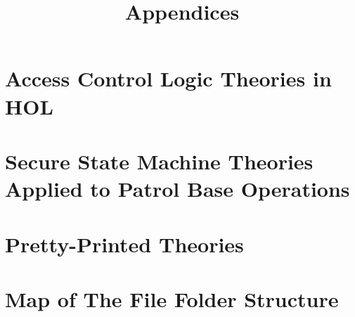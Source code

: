 \documentclass[../main/main.tex]{subfiles}
\begin{document}
\title{Appendices}

\begin{appendices}
\chapter{Access Control Logic Theories in HOL}
\chapter{Secure State Machine Theories Applied to Patrol Base Operations}
\chapter{Pretty-Printed Theories}
\chapter{Map of The File Folder Structure}
\end{appendices}
\end{document}
